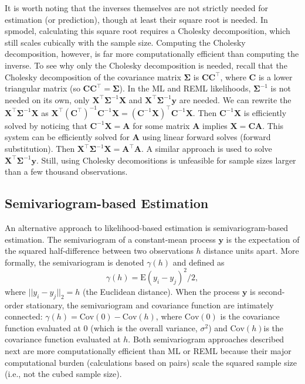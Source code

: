 \documentclass{article}
\begin{document}
It is worth noting that the inverses themselves are not strictly needed
for estimation (or prediction), though at least their square root is
needed. In spmodel, calculating this square root requires a Cholesky
decomposition, which still scales cubically with the sample size.
Computing the Cholesky decomposition, however, is far more
computationally efficient than computing the inverse. To see why only
the Cholesky decomposition is needed, recall that the Cholesky
decomposition of the covariance matrix \(\mathbf{\Sigma}\) is
\(\mathbf{C}\mathbf{C}^\intercal\), where \(\mathbf{C}\) is a lower
triangular matrix (so
\(\mathbf{C}\mathbf{C}^\intercal = \mathbf{\Sigma}\)). In the ML and
REML likelihoods, \(\mathbf{\Sigma}^{-1}\) is not needed on its own,
only \(\mathbf{X}^\intercal \mathbf{\Sigma}^{-1} \mathbf{X}\) and
\(\mathbf{X}^\intercal \mathbf{\Sigma}^{-1} \mathbf{y}\) are needed. We
can rewrite the \(\mathbf{X}^\intercal \mathbf{\Sigma}^{-1} \mathbf{X}\)
as
\(\mathbf{X}^\intercal (\mathbf{C}^\intercal)^{-1} \mathbf{C}^{-1} \mathbf{X} = (\mathbf{C}^{-1} \mathbf{X})^\intercal \mathbf{C}^{-1} \mathbf{X}\).
Then \(\mathbf{C}^{-1} \mathbf{X}\) is efficiently solved by noticing
that \(\mathbf{C}^{-1} \mathbf{X} = \mathbf{A}\) for some matrix
\(\mathbf{A}\) implies \(\mathbf{X} = \mathbf{C} \mathbf{A}\). This
system can be efficiently solved for \(\mathbf{A}\) using linear forward
solves (forward substitution). Then
\(\mathbf{X}^\intercal \mathbf{\Sigma}^{-1} \mathbf{X} = \mathbf{A}^\intercal \mathbf{A}\).
A similar approach is used to solve
\(\mathbf{X}^\intercal \mathbf{\Sigma}^{-1} \mathbf{y}\). Still, using
Cholesky decomositions is unfeasible for sample sizes larger than a few
thousand observations.

\hypertarget{semivariogram-based-estimation}{%
\subsection{Semivariogram-based
Estimation}\label{semivariogram-based-estimation}}

An alternative approach to likelihood-based estimation is
semivariogram-based estimation. The semivariogram of a constant-mean
process \(\mathbf{y}\) is the expectation of the squared half-difference
between two observations \(h\) distance units apart. More formally, the
semivariogram is denoted \(\gamma(h)\) and defined as
\begin{equation}\label{eq:sv}
  \gamma(h) = \text{E}(y_i - y_j)^2 / 2 ,
\end{equation} where \(||y_i - y_j||_2 = h\) (the Euclidean distance).
When the process \(\mathbf{y}\) is second-order stationary, the
semivariogram and covariance function are intimately connected:
\(\gamma(h) = \text{Cov}(0) - \text{Cov}(h)\), where \(\text{Cov}(0)\)
is the covariance function evaluated at 0 (which is the overall
variance, \(\sigma^2\)) and \(\text{Cov}(h)\)is the covariance function
evaluated at \(h\). Both semivariogram approaches described next are
more computationally efficient than ML or REML because their major
computational burden (calculations based on pairs) scale the squared
sample size (i.e., not the cubed sample size).
\end{document}
